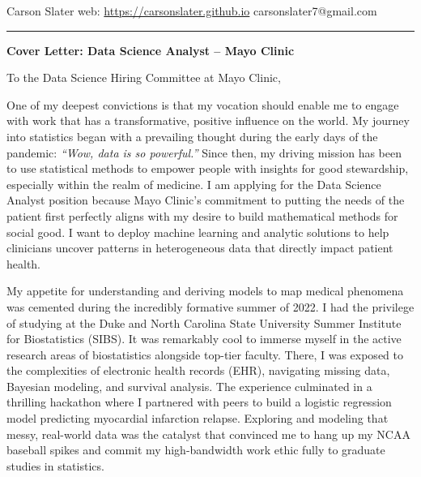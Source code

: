 \documentclass[11pt]{article}
\begin{document}
\noindent
Carson Slater \hfill web: \href{https://carsonslater.github.io}{https://carsonslater.github.io} \hfill carsonslater7@gmail.com \\
\rule{\textwidth}{0.4pt}

\vspace{2em}

\begin{center}
    \Large \textbf{Cover Letter: Data Science Analyst -- Mayo Clinic}
\end{center}

\vspace{1em}

\noindent
To the Data Science Hiring Committee at Mayo Clinic,

\vspace{1em}

One of my deepest convictions is that my vocation should enable me to engage with work that has a transformative, positive influence on the world. My journey into statistics began with a prevailing thought during the early days of the pandemic: \textit{``Wow, data is so powerful.''} Since then, my driving mission has been to use statistical methods to empower people with insights for good stewardship, especially within the realm of medicine. I am applying for the Data Science Analyst position because Mayo Clinic's commitment to putting the needs of the patient first perfectly aligns with my desire to build mathematical methods for social good. I want to deploy machine learning and analytic solutions to help clinicians uncover patterns in heterogeneous data that directly impact patient health.

My appetite for understanding and deriving models to map medical phenomena was cemented during the incredibly formative summer of 2022. I had the privilege of studying at the Duke and North Carolina State University Summer Institute for Biostatistics (SIBS). It was remarkably cool to immerse myself in the active research areas of biostatistics alongside top-tier faculty. There, I was exposed to the complexities of electronic health records (EHR), navigating missing data, Bayesian modeling, and survival analysis. The experience culminated in a thrilling hackathon where I partnered with peers to build a logistic regression model predicting myocardial infarction relapse. Exploring and modeling that messy, real-world data was the catalyst that convinced me to hang up my NCAA baseball spikes and commit my high-bandwidth work ethic fully to graduate studies in statistics.
\end{document}
